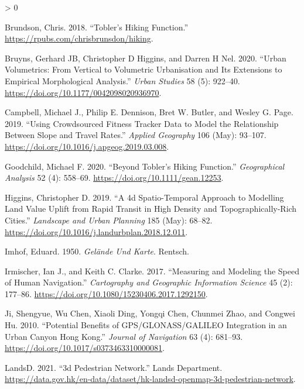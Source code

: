 \documentclass{article}
\newlength{\cslhangindent}
\newenvironment{CSLReferences}[2] %
 {%
  \setlength{\parindent}{0pt}
  \ifodd #1 \everypar{\setlength{\hangindent}{\cslhangindent}}\ignorespaces\fi
  \ifnum #2 > 0
  \setlength{\parskip}{#2\baselineskip}
  \fi
 }%
 {}
\begin{document}
\hypertarget{refs}{}
\begin{CSLReferences}{1}{0}
\leavevmode\hypertarget{ref-brundson2018}{}%
Brundson, Chris. 2018. {``Tobler's Hiking Function.''}
\url{https://rpubs.com/chrisbrunsdon/hiking}.

\leavevmode\hypertarget{ref-bruyns2020}{}%
Bruyns, Gerhard JB, Christopher D Higgins, and Darren H Nel. 2020.
{``Urban Volumetrics: From Vertical to Volumetric Urbanisation and Its
Extensions to Empirical Morphological Analysis.''} \emph{Urban Studies}
58 (5): 922--40. \url{https://doi.org/10.1177/0042098020936970}.

\leavevmode\hypertarget{ref-campbell2019}{}%
Campbell, Michael J., Philip E. Dennison, Bret W. Butler, and Wesley G.
Page. 2019. {``Using Crowdsourced Fitness Tracker Data to Model the
Relationship Between Slope and Travel Rates.''} \emph{Applied Geography}
106 (May): 93--107. \url{https://doi.org/10.1016/j.apgeog.2019.03.008}.

\leavevmode\hypertarget{ref-goodchild2020}{}%
Goodchild, Michael F. 2020. {``Beyond Tobler{'}s Hiking Function.''}
\emph{Geographical Analysis} 52 (4): 558--69.
\url{https://doi.org/10.1111/gean.12253}.

\leavevmode\hypertarget{ref-higgins2019}{}%
Higgins, Christopher D. 2019. {``A 4d Spatio-Temporal Approach to
Modelling Land Value Uplift from Rapid Transit in High Density and
Topographically-Rich Cities.''} \emph{Landscape and Urban Planning} 185
(May): 68--82. \url{https://doi.org/10.1016/j.landurbplan.2018.12.011}.

\leavevmode\hypertarget{ref-imhof1950}{}%
Imhof, Eduard. 1950. \emph{Gel{ä}nde Und Karte}. Rentsch.

\leavevmode\hypertarget{ref-irmischer2017}{}%
Irmischer, Ian J., and Keith C. Clarke. 2017. {``Measuring and Modeling
the Speed of Human Navigation.''} \emph{Cartography and Geographic
Information Science} 45 (2): 177--86.
\url{https://doi.org/10.1080/15230406.2017.1292150}.

\leavevmode\hypertarget{ref-ji2010}{}%
Ji, Shengyue, Wu Chen, Xiaoli Ding, Yongqi Chen, Chunmei Zhao, and
Congwei Hu. 2010. {``Potential Benefits of GPS/GLONASS/GALILEO
Integration in an Urban Canyon {{}} Hong Kong.''} \emph{Journal of
Navigation} 63 (4): 681--93.
\url{https://doi.org/10.1017/s0373463310000081}.

\leavevmode\hypertarget{ref-landsd2021}{}%
LandsD. 2021. {``3d Pedestrian Network.''} Lands Department.
\url{https://data.gov.hk/en-data/dataset/hk-landsd-openmap-3d-pedestrian-network}.


\end{CSLReferences}
\end{document}
